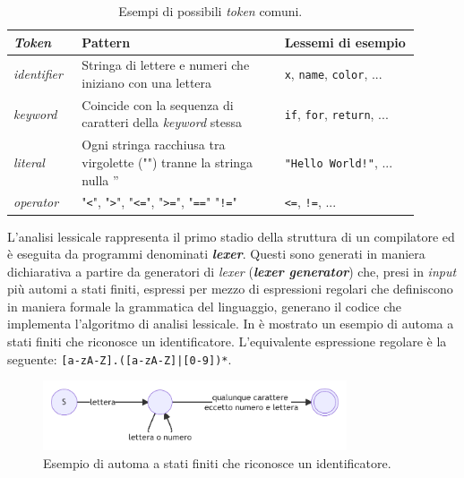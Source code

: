 \begin{table}[h]
    \centering
    \begin{tabular}{|p{0.15\linewidth}|p{0.45\linewidth}|p{0.3\linewidth}|}
        \hline
        \textbf{\textit{Token}} & \textbf{Pattern} & \textbf{Lessemi di esempio} \\ [0.5ex] 
        \hline\hline
        \textit{identifier} & Stringa di lettere e numeri che iniziano con una lettera & \texttt{x}, \texttt{name}, \texttt{color}, ... \\ 
        \hline
        \textit{keyword} & Coincide con la sequenza di caratteri della \textit{keyword} stessa & \texttt{if}, \texttt{for}, \texttt{return}, ... \\
        \hline
        \textit{literal} & Ogni stringa racchiusa tra virgolette ("") tranne la stringa nulla '' & \texttt{"Hello World!"}, ... \\
        \hline
        \textit{operator} & "\texttt{<}", "\texttt{>}", "\texttt{<=}", "\texttt{>=}", "\texttt{==}" "\texttt{!=}" & \texttt{<=}, \texttt{!=}, ... \\
        \hline
    \end{tabular}
    \caption{Esempi di possibili \textit{token} comuni.}
    \label{table:token-examples}
\end{table}

L'analisi lessicale rappresenta il primo stadio della struttura di un compilatore ed è eseguita da programmi denominati \textbf{\textit{lexer}}. 
%
Questi sono generati in maniera dichiarativa a partire da generatori di \textit{lexer} (\textbf{\textit{lexer generator}}) che, presi in \textit{input} più automi a stati finiti, espressi per mezzo di espressioni regolari che definiscono in maniera formale la grammatica del linguaggio, generano il codice che implementa l'algoritmo di analisi lessicale. 
%
In  è mostrato un esempio di automa a stati finiti che riconosce un identificatore.
%
L'equivalente espressione regolare è la seguente: \texttt{[a-zA-Z].([a-zA-Z]|[0-9])*}.

\begin{figure}[h]
    \centering
    \includegraphics[width=0.8\textwidth]{resources/img/01-id-finite-automa.pdf}
    \caption{Esempio di automa a stati finiti che riconosce un identificatore.}
    \label{img:01-id-finite-automa}
\end{figure}

